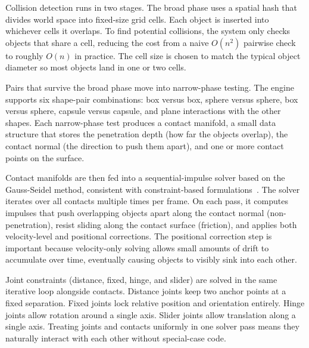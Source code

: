 \documentclass[9pt,openany]{extbook}
\begin{document}
Collision detection runs in two stages. The broad phase uses a spatial hash that divides world space into fixed-size grid cells. Each object is inserted into whichever cells it overlaps. To find potential collisions, the system only checks objects that share a cell, reducing the cost from a naive $O(n^2)$ pairwise check to roughly $O(n)$ in practice. The cell size is chosen to match the typical object diameter so most objects land in one or two cells.

Pairs that survive the broad phase move into narrow-phase testing. The engine supports six shape-pair combinations: box versus box, sphere versus sphere, box versus sphere, capsule versus capsule, and plane interactions with the other shapes. Each narrow-phase test produces a contact manifold, a small data structure that stores the penetration depth (how far the objects overlap), the contact normal (the direction to push them apart), and one or more contact points on the surface.

Contact manifolds are then fed into a sequential-impulse solver based on the Gauss-Seidel method, consistent with constraint-based formulations~\cite{baraff1994}. The solver iterates over all contacts multiple times per frame. On each pass, it computes impulses that push overlapping objects apart along the contact normal (non-penetration), resist sliding along the contact surface (friction), and applies both velocity-level and positional corrections. The positional correction step is important because velocity-only solving allows small amounts of drift to accumulate over time, eventually causing objects to visibly sink into each other.

Joint constraints (distance, fixed, hinge, and slider) are solved in the same iterative loop alongside contacts. Distance joints keep two anchor points at a fixed separation. Fixed joints lock relative position and orientation entirely. Hinge joints allow rotation around a single axis. Slider joints allow translation along a single axis. Treating joints and contacts uniformly in one solver pass means they naturally interact with each other without special-case code.
\end{document}
